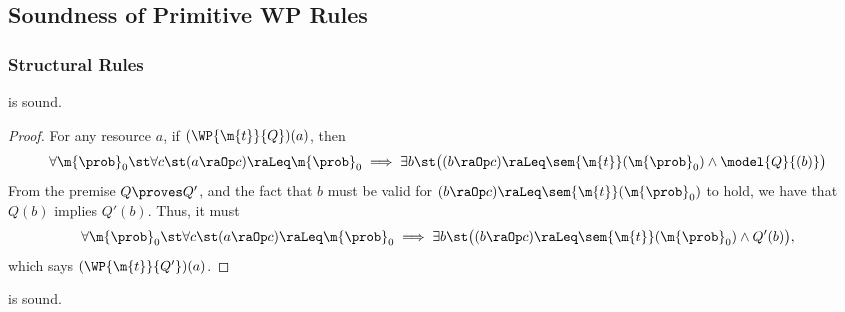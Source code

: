 \subsection{Soundness of Primitive WP Rules}
\label{sec:appendix:wp-rules}


\subsubsection{Structural Rules}
\begin{lemma}
\label{proof:wp-cons}
   is sound.
\end{lemma}

\begin{proof}
  For any resource $a$,
  if $(\WP {\m{t}} {Q})(a)$, then
  \[
    \forall \m{\prob}_0 \st
    \forall c \st
    (a \raOp c) \raLeq \m{\prob}_0
    \implies
    \exists b \st
    \bigl(
      (b \raOp c) \raLeq \sem{\m{t}}(\m{\prob}_0)
      \land
      \model{Q}{(b)}
    \bigr)
  \]
  From the premise $Q \proves Q'$, and the fact that $b$ must be valid for $ (b \raOp c) \raLeq \sem{\m{t}}(\m{\prob}_0) $ to hold, we have that $Q(b)$ implies $Q'(b)$.
  Thus, it must
  \[
    \forall \m{\prob}_0 \st
    \forall c \st
    (a \raOp c) \raLeq \m{\prob}_0
    \implies
    \exists b \st
    \bigl(
      (b \raOp c) \raLeq \sem{\m{t}}(\m{\prob}_0)
      \land
      Q'(b)
    \bigr),
  \]
  which says $(\WP {\m{t}} {Q'})(a)$.
\end{proof} \begin{lemma}
\label{proof:wp-frame}
   is sound.
\end{lemma}

